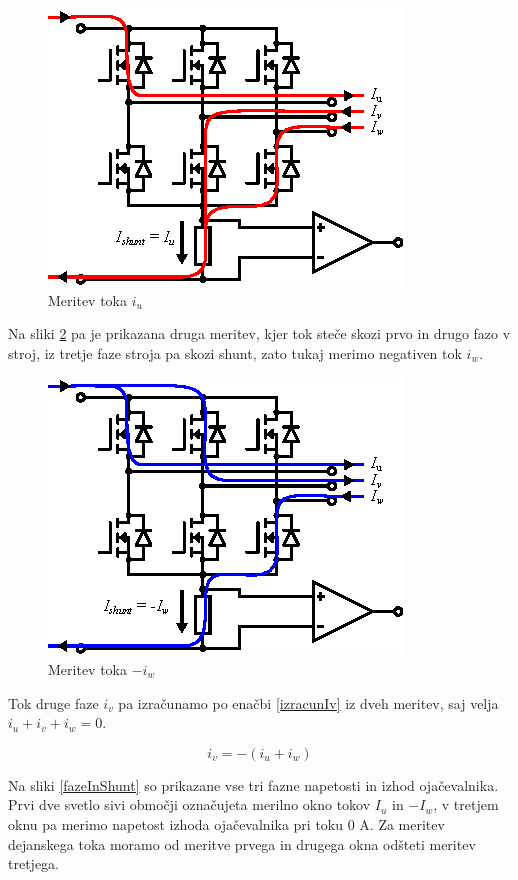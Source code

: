 \documentclass[a4paper,twoside,openright,12pt,slovene]{book}
\begin{document}
\begin{figure}[!htbp]
    \centering
    \includegraphics[width=0.5\columnwidth]{Slike/Inkscape/meritevTokaIu.eps}
    \caption{\label{meritevTokaIu} Meritev toka $i_u$ }
\end{figure}

Na sliki \ref{meritevTokaIw} pa je prikazana druga meritev, kjer tok steče skozi prvo in drugo fazo v stroj, iz tretje faze stroja pa skozi shunt, zato tukaj merimo negativen tok $i_w$. 

\begin{figure}[!htbp]
    \centering
    \includegraphics[width=0.5\columnwidth]{Slike/Inkscape/meritevTokaIw.eps}
    \caption{\label{meritevTokaIw} Meritev toka $-i_w$ }
\end{figure}

Tok druge faze $i_v$ pa izračunamo po enačbi \ref{izracunIv} iz dveh meritev, saj velja $i_u + i_v + i_w = 0$.

\begin{equation} \label{izracunIv}
i_v = -(i_u + i_w)
\end{equation}

Na sliki \ref{fazeInShunt} so prikazane vse tri fazne napetosti in izhod ojačevalnika. Prvi dve svetlo sivi območji označujeta merilno okno tokov $I_u$ in $- I_w$, v tretjem oknu pa merimo napetost
izhoda ojačevalnika pri toku 0 A. Za meritev dejanskega toka moramo od meritve prvega in drugega okna odšteti meritev tretjega.
\end{document}
